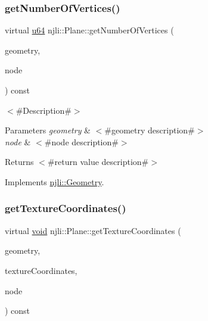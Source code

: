 \mbox{\label{classnjli_1_1_plane_a6e25a6d9b9819d375c257b68a1e8a6d6}} 
\subsubsection{\texorpdfstring{get\+Number\+Of\+Vertices()}{getNumberOfVertices()}}
{\footnotesize\ttfamily virtual \mbox{\hyperlink{_util_8h_ad758b7a5c3f18ed79d2fcd23d9f16357}{u64}} njli\+::\+Plane\+::get\+Number\+Of\+Vertices (\begin{DoxyParamCaption}\item[{\mbox{\hyperlink{classnjli_1_1_level_of_detail}{Level\+Of\+Detail}} $\ast$}]{geometry,  }\item[{\mbox{\hyperlink{classnjli_1_1_node}{Node}} $\ast$}]{node }\end{DoxyParamCaption}) const\hspace{0.3cm}{\ttfamily [virtual]}}

$<$\#\+Description\#$>$


\begin{DoxyParams}{Parameters}
{\em geometry} & $<$\#geometry description\#$>$ \\
\hline
{\em node} & $<$\#node description\#$>$\\
\hline
\end{DoxyParams}
\begin{DoxyReturn}{Returns}
$<$\#return value description\#$>$ 
\end{DoxyReturn}


Implements \mbox{\hyperlink{classnjli_1_1_geometry_a125699411e1abc464f923fe4e72fc65b}{njli\+::\+Geometry}}.

\mbox{\label{classnjli_1_1_plane_a55020a9815103781fbe1846cf8b5c81e}} 
\subsubsection{\texorpdfstring{get\+Texture\+Coordinates()}{getTextureCoordinates()}}
{\footnotesize\ttfamily virtual \mbox{\hyperlink{_thread_8h_af1e856da2e658414cb2456cb6f7ebc66}{void}} njli\+::\+Plane\+::get\+Texture\+Coordinates (\begin{DoxyParamCaption}\item[{\mbox{\hyperlink{classnjli_1_1_level_of_detail}{Level\+Of\+Detail}} $\ast$}]{geometry,  }\item[{bt\+Vector2 $\ast$$\ast$}]{texture\+Coordinates,  }\item[{\mbox{\hyperlink{classnjli_1_1_node}{Node}} $\ast$}]{node }\end{DoxyParamCaption}) const\hspace{0.3cm}{\ttfamily [virtual]}}

